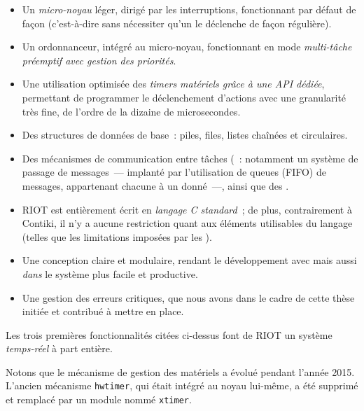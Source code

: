 \begin{itemize}

\item Un \emph{micro-noyau} léger, dirigé par les interruptions,
fonctionnant par défaut de façon  (c'est-à-dire sans
nécessiter qu'un  le déclenche de façon régulière).

\item Un ordonnanceur, intégré au micro-noyau, fonctionnant en mode
\emph{multi-tâche préemptif avec gestion des priorités}.

\item Une utilisation optimisée des \emph{timers matériels grâce à une
API dédiée}, permettant de programmer le déclenchement d'actions avec
une granularité très fine, de l'ordre de la dizaine de microsecondes.

\item Des structures de données de base~: piles, files, listes
chaînées et circulaires.

\item Des mécanismes de communication entre tâches (~:
notamment un système de passage de messages~--- implanté par l'utilisation
de queues (FIFO) de messages, appartenant chacune à un 
donné~---, ainsi que des .

\item RIOT est entièrement écrit en \emph{langage C standard}~;
de plus, contrairement à Contiki, il n'y a aucune restriction quant
aux éléments utilisables du langage (telles que les limitations
imposées par les ).

\item Une conception claire et modulaire, rendant le développement
avec mais aussi \emph{dans} le système plus facile et productive.

\item Une gestion des erreurs critiques, que nous avons dans le cadre
de cette thèse initiée et contribué à mettre en place.

\end{itemize}

Les trois premières fonctionnalités citées ci-dessus font de RIOT
un système \emph{temps-réel} à part entière.

\bigskip

Notons que le mécanisme de gestion des  matériels a évolué
pendant l'année 2015. L'ancien mécanisme \texttt{hwtimer}, qui était intégré
au noyau lui-même, a été supprimé et remplacé par un module nommé
\texttt{xtimer}.

